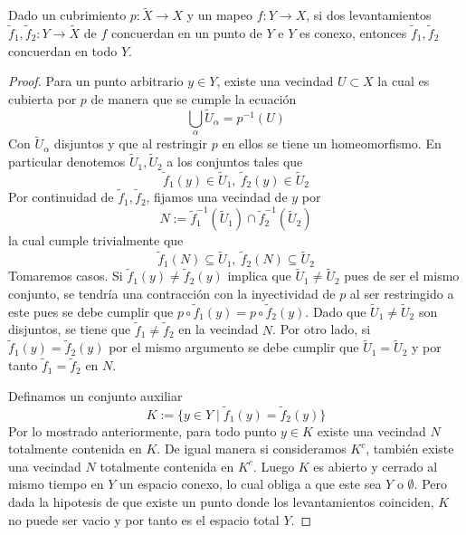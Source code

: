 \begin{teorema}\label{thm:uniq-general}
  Dado un cubrimiento \(p : \tilde X \to X\) y un mapeo \(f : Y \to X\),
  si dos levantamientos \(\tilde f _1 , \tilde f _2 : Y \to \tilde X\)
  de \(f\) concuerdan en un punto de \(Y\) e \(Y\) es conexo, entonces
  \(\tilde f _1 , \tilde f _2\) concuerdan en todo \(Y\).
\end{teorema}
\begin{proof}
  Para un punto arbitrario \(y \in Y\), existe una vecindad \(U \subset
  X\) la cual es cubierta por \(p\) de manera que se cumple la
  ecuación
  \[ \bigcup_{\alpha} \tilde U_\alpha = p^{-1} \left( U \right)\]
  Con \(\tilde U _\alpha\) disjuntos y que al restringir \(p\) en ellos
  se tiene un homeomorfismo. En particular denotemos \(\tilde U
  _1 , \tilde U _2\) a los conjuntos tales que
  \[ \tilde f _1 ( y ) \in \tilde U _1,\ \tilde f _2 ( y ) \in \tilde U
    _2 \]
  Por continuidad de \(\tilde f_1, \tilde f_2 \), fijamos una vecindad
  de \(y\) por
  \[ N := \tilde f _1 ^{-1} (\tilde U _1) \cap \tilde f _2 ^{-1} (\tilde
    U _2) \]
  la cual cumple trivialmente que
  \[ \tilde f_1 (N) \subseteq \tilde U _1,\ \tilde f_2 (N) \subseteq
    \tilde U _2 \]
  Tomaremos casos. Si \(\tilde f _1 (y) \neq \tilde f _2 (y)\) implica
  que \(\tilde U _1 \neq \tilde U _2\) pues de ser el mismo conjunto, se
  tendría una contracción con la inyectividad de \(p\) al ser
  restringido a este pues se debe cumplir que \( p \circ \tilde f _1 (y)
  = p \circ \tilde f _2 (y)\). Dado que \(\tilde U_1 \neq \tilde U _ 2\)
  son disjuntos, se tiene que \(\tilde f_1 \neq \tilde f_2 \) en la
  vecindad \(N\). Por otro lado, si \(\tilde f _1 (y) = \tilde f _2
  (y)\) por el mismo argumento se debe cumplir que \(\tilde U _1 = \tilde
  U _2\) y por tanto \(\tilde f _1 = \tilde f _2\) en \(N\).

  Definamos un conjunto auxiliar
  \[ K := \{ y \in Y \mid \tilde f_1 (y) = \tilde f_2 (y) \} \]
  Por lo mostrado anteriormente, para todo punto \(y \in K\) existe una
  vecindad \(N\) totalmente contenida en \(K\). De igual manera si
  consideramos \(K^c\), también existe una vecindad \(N\) totalmente
  contenida en \(K^c\). Luego \(K\) es abierto y cerrado al mismo tiempo
  en \(Y\) un espacio conexo, lo cual obliga a que este sea \(Y\) o
  \(\emptyset\). Pero dada la hipotesis de que existe un punto donde los
  levantamientos coinciden, \(K\) no puede ser vacio y por tanto es el
  espacio total \(Y\).
\end{proof}

